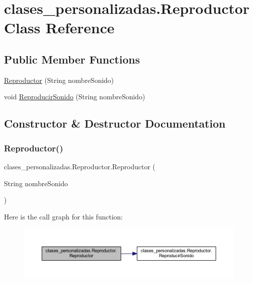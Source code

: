\hypertarget{classclases__personalizadas_1_1_reproductor}{}\section{clases\+\_\+personalizadas.\+Reproductor Class Reference}
\label{classclases__personalizadas_1_1_reproductor}
\subsection*{Public Member Functions}
\begin{DoxyCompactItemize}
\item 
\mbox{\hyperlink{classclases__personalizadas_1_1_reproductor_a48df5e1ca4f886e56f815f0e3c0c923a}{Reproductor}} (String nombre\+Sonido)
\item 
void \mbox{\hyperlink{classclases__personalizadas_1_1_reproductor_ad2f1672777df1378f356c702eb44009f}{Reproducir\+Sonido}} (String nombre\+Sonido)
\end{DoxyCompactItemize}


\subsection{Constructor \& Destructor Documentation}
\mbox{\label{classclases__personalizadas_1_1_reproductor_a48df5e1ca4f886e56f815f0e3c0c923a}} 
\subsubsection{\texorpdfstring{Reproductor()}{Reproductor()}}
{\footnotesize\ttfamily clases\+\_\+personalizadas.\+Reproductor.\+Reproductor (\begin{DoxyParamCaption}\item[{String}]{nombre\+Sonido }\end{DoxyParamCaption})}

Here is the call graph for this function\+:
\nopagebreak
\begin{figure}[H]
\begin{center}
\leavevmode
\includegraphics[width=350pt]{classclases__personalizadas_1_1_reproductor_a48df5e1ca4f886e56f815f0e3c0c923a_cgraph}
\end{center}
\end{figure}



